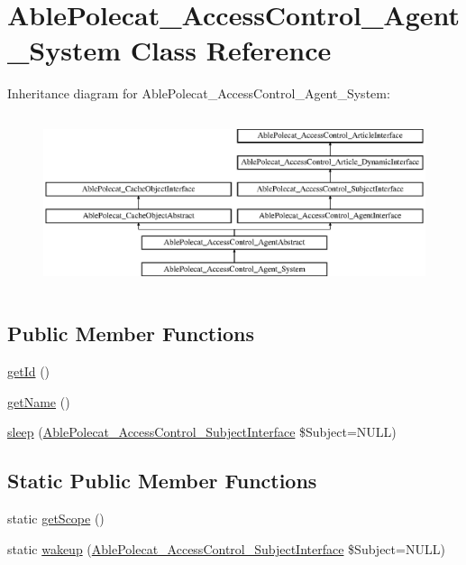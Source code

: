 \hypertarget{class_able_polecat___access_control___agent___system}{}\section{Able\+Polecat\+\_\+\+Access\+Control\+\_\+\+Agent\+\_\+\+System Class Reference}
\label{class_able_polecat___access_control___agent___system}
Inheritance diagram for Able\+Polecat\+\_\+\+Access\+Control\+\_\+\+Agent\+\_\+\+System\+:\begin{figure}[H]
\begin{center}
\leavevmode
\includegraphics[height=5.121951cm]{class_able_polecat___access_control___agent___system}
\end{center}
\end{figure}
\subsection*{Public Member Functions}
\begin{DoxyCompactItemize}
\item 
\hyperlink{class_able_polecat___access_control___agent___system_a12251d0c022e9e21c137a105ff683f13}{get\+Id} ()
\item 
\hyperlink{class_able_polecat___access_control___agent___system_a3d0963e68bb313b163a73f2803c64600}{get\+Name} ()
\item 
\hyperlink{class_able_polecat___access_control___agent___system_a365e24d7b066205cafa2a5cce3a4f224}{sleep} (\hyperlink{interface_able_polecat___access_control___subject_interface}{Able\+Polecat\+\_\+\+Access\+Control\+\_\+\+Subject\+Interface} \$Subject=N\+U\+L\+L)
\end{DoxyCompactItemize}
\subsection*{Static Public Member Functions}
\begin{DoxyCompactItemize}
\item 
static \hyperlink{class_able_polecat___access_control___agent___system_ad9ade868bd136d32967059d1cccb3e92}{get\+Scope} ()
\item 
static \hyperlink{class_able_polecat___access_control___agent___system_a3f2135f6ad45f51d075657f6d20db2cd}{wakeup} (\hyperlink{interface_able_polecat___access_control___subject_interface}{Able\+Polecat\+\_\+\+Access\+Control\+\_\+\+Subject\+Interface} \$Subject=N\+U\+L\+L)
\end{DoxyCompactItemize}
